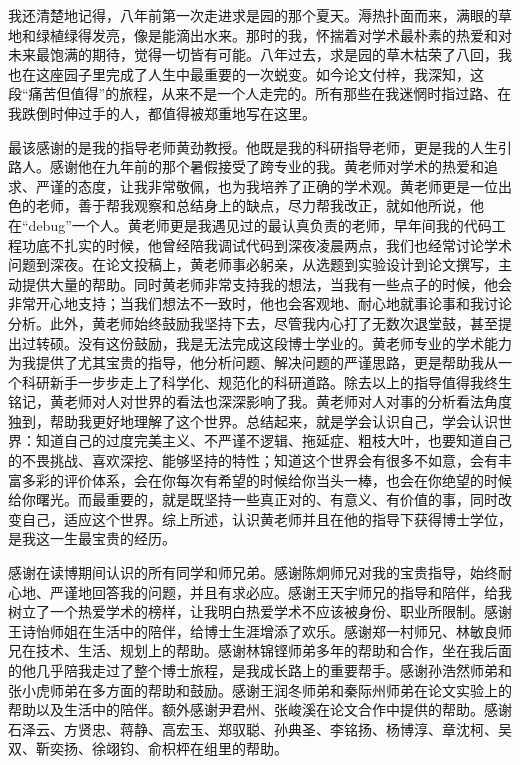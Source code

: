 \cleardoublepage
{}
    我还清楚地记得，八年前第一次走进求是园的那个夏天。溽热扑面而来，满眼的草地和绿植绿得发亮，像是能滴出水来。那时的我，怀揣着对学术最朴素的热爱和对未来最饱满的期待，觉得一切皆有可能。八年过去，求是园的草木枯荣了八回，我也在这座园子里完成了人生中最重要的一次蜕变。如今论文付梓，我深知，这段“痛苦但值得”的旅程，从来不是一个人走完的。所有那些在我迷惘时指过路、在我跌倒时伸过手的人，都值得被郑重地写在这里。

    最该感谢的是我的指导老师黄劲教授。他既是我的科研指导老师，更是我的人生引路人。感谢他在九年前的那个暑假接受了跨专业的我。黄老师对学术的热爱和追求、严谨的态度，让我非常敬佩，也为我培养了正确的学术观。黄老师更是一位出色的老师，善于帮我观察和总结身上的缺点，尽力帮我改正，就如他所说，他在“debug”一个人。黄老师更是我遇见过的最认真负责的老师，早年间我的代码工程功底不扎实的时候，他曾经陪我调试代码到深夜凌晨两点，我们也经常讨论学术问题到深夜。在论文投稿上，黄老师事必躬亲，从选题到实验设计到论文撰写，主动提供大量的帮助。同时黄老师非常支持我的想法，当我有一些点子的时候，他会非常开心地支持；当我们想法不一致时，他也会客观地、耐心地就事论事和我讨论分析。此外，黄老师始终鼓励我坚持下去，尽管我内心打了无数次退堂鼓，甚至提出过转硕。没有这份鼓励，我是无法完成这段博士学业的。黄老师专业的学术能力为我提供了尤其宝贵的指导，他分析问题、解决问题的严谨思路，更是帮助我从一个科研新手一步步走上了科学化、规范化的科研道路。除去以上的指导值得我终生铭记，黄老师对人对世界的看法也深深影响了我。黄老师对人对事的分析看法角度独到，帮助我更好地理解了这个世界。总结起来，就是学会认识自己，学会认识世界：知道自己的过度完美主义、不严谨不逻辑、拖延症、粗枝大叶，也要知道自己的不畏挑战、喜欢深挖、能够坚持的特性；知道这个世界会有很多不如意，会有丰富多彩的评价体系，会在你每次有希望的时候给你当头一棒，也会在你绝望的时候给你曙光。而最重要的，就是既坚持一些真正对的、有意义、有价值的事，同时改变自己，适应这个世界。综上所述，认识黄老师并且在他的指导下获得博士学位，是我这一生最宝贵的经历。

    感谢在读博期间认识的所有同学和师兄弟。感谢陈炯师兄对我的宝贵指导，始终耐心地、严谨地回答我的问题，并且有求必应。感谢王天宇师兄的指导和陪伴，给我树立了一个热爱学术的榜样，让我明白热爱学术不应该被身份、职业所限制。感谢王诗怡师姐在生活中的陪伴，给博士生涯增添了欢乐。感谢郑一村师兄、林敏良师兄在技术、生活、规划上的帮助。感谢林锦铿师弟多年的帮助和合作，坐在我后面的他几乎陪我走过了整个博士旅程，是我成长路上的重要帮手。感谢孙浩然师弟和张小虎师弟在多方面的帮助和鼓励。感谢王润冬师弟和秦际州师弟在论文实验上的帮助以及生活中的陪伴。额外感谢尹君州、张峻溪在论文合作中提供的帮助。感谢石泽云、方贤忠、蒋静、高宏玉、郑驭聪、孙典圣、李铭扬、杨博淳、章沈柯、吴双、靳奕扬、徐翊钧、俞枳枰在组里的帮助。

